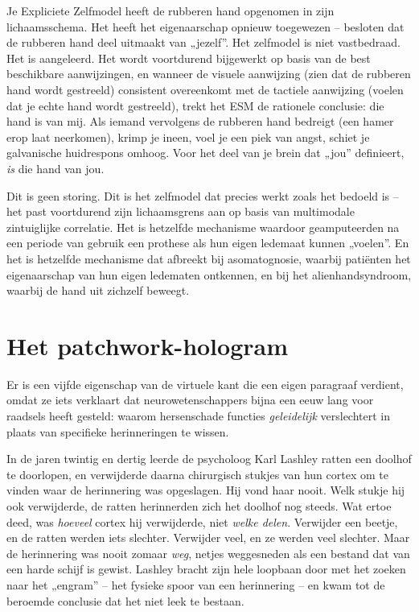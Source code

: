 \documentclass[11pt, twoside, openright]{book}
\begin{document}
Je Expliciete Zelfmodel heeft de rubberen hand opgenomen in zijn lichaamsschema. Het heeft het eigenaarschap opnieuw toegewezen -- besloten dat de rubberen hand deel uitmaakt van „jezelf”. Het zelfmodel is niet vastbedraad. Het is aangeleerd. Het wordt voortdurend bijgewerkt op basis van de best beschikbare aanwijzingen, en wanneer de visuele aanwijzing (zien dat de rubberen hand wordt gestreeld) consistent overeenkomt met de tactiele aanwijzing (voelen dat je echte hand wordt gestreeld), trekt het ESM de rationele conclusie: die hand is van mij. Als iemand vervolgens de rubberen hand bedreigt (een hamer erop laat neerkomen), krimp je ineen, voel je een piek van angst, schiet je galvanische huidrespons omhoog. Voor het deel van je brein dat „jou” definieert, \textit{is} die hand van jou.

Dit is geen storing. Dit is het zelfmodel dat precies werkt zoals het bedoeld is -- het past voortdurend zijn lichaamsgrens aan op basis van multimodale zintuiglijke correlatie. Het is hetzelfde mechanisme waardoor geamputeerden na een periode van gebruik een prothese als hun eigen ledemaat kunnen „voelen”. En het is hetzelfde mechanisme dat afbreekt bij asomatognosie, waarbij patiënten het eigenaarschap van hun eigen ledematen ontkennen, en bij het alienhandsyndroom, waarbij de hand uit zichzelf beweegt.

\section*{Het patchwork-hologram}

Er is een vijfde eigenschap van de virtuele kant die een eigen paragraaf verdient, omdat ze iets verklaart dat neurowetenschappers bijna een eeuw lang voor raadsels heeft gesteld: waarom hersenschade functies \textit{geleidelijk} verslechtert in plaats van specifieke herinneringen te wissen.

In de jaren twintig en dertig leerde de psycholoog Karl Lashley ratten een doolhof te doorlopen, en verwijderde daarna chirurgisch stukjes van hun cortex om te vinden waar de herinnering was opgeslagen. Hij vond haar nooit. Welk stukje hij ook verwijderde, de ratten herinnerden zich het doolhof nog steeds. Wat ertoe deed, was \textit{hoeveel} cortex hij verwijderde, niet \textit{welke delen}. Verwijder een beetje, en de ratten werden iets slechter. Verwijder veel, en ze werden veel slechter. Maar de herinnering was nooit zomaar \textit{weg}, netjes weggesneden als een bestand dat van een harde schijf is gewist. Lashley bracht zijn hele loopbaan door met het zoeken naar het „engram” -- het fysieke spoor van een herinnering -- en kwam tot de beroemde conclusie dat het niet leek te bestaan.
\end{document}
